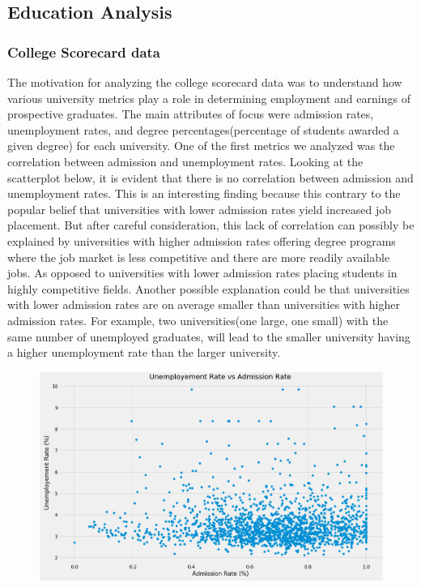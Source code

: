 \subsection{Education Analysis}
\subsubsection{College Scorecard data}
The motivation for analyzing the college scorecard data \cite{collegeScorecard} was to understand how various university metrics play a role in determining employment and earnings of prospective graduates. The main attributes of focus were admission rates, unemployment rates, and degree percentages(percentage of students awarded a given degree) for each university. One of the first metrics we analyzed was the correlation between admission and unemployment rates. Looking at the scatterplot below, it is evident that there is no correlation between admission and unemployment rates. This is an interesting finding because this contrary to the popular belief that universities with lower admission rates yield increased job placement. But after careful consideration, this lack of correlation can possibly be explained by universities with higher admission rates offering degree programs where the job market is less competitive and there are more readily available jobs. As opposed to universities with lower admission rates placing students in highly competitive fields. Another possible explanation could be that universities with lower admission rates are on average smaller than universities with higher admission rates. For example, two universities(one large, one small) with the same number of unemployed graduates, will lead to the smaller university having a higher unemployment rate than the larger university.
\begin{figure} 
	  \includegraphics[width=\textwidth]{images/adm_unem_rate_scatter.png}
	\label{fig:test3}
\end{figure}


